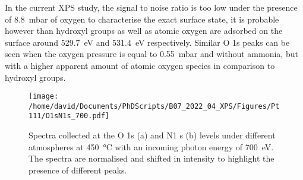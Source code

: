 In the current XPS study, the signal to noise ratio is too low under the presence of \qty{8.8}{\milli\bar} of oxygen to characterise the exact surface state, it is probable however than hydroxyl groups as well as atomic oxygen are adsorbed on the surface around \qty{529.7}{\eV} and \qty{531.4}{\eV} respectively.
Similar O 1s peaks can be seen when the oxygen pressure is equal to \qty{0.55}{\milli\bar} and without ammonia, but with a higher apparent amount of atomic oxygen species in comparison to hydroxyl groups.

\begin{figure}[!htb]
    \centering
    \texttt{[image: /home/david/Documents/PhDScripts/B07\_2022\_04\_XPS/Figures/Pt111/O1sN1s\_700.pdf]}
    \caption{
        Spectra collected at the O 1s (a) and N1 s (b) levels under different atmospheres at \qty{450}{\degreeCelsius} with an incoming photon energy of \qty{700}{\eV}.
        The spectra are normalised and shifted in intensity to highlight the presence of different peaks.
    }
    \label{fig:O1sN1sPt111}
\end{figure}
